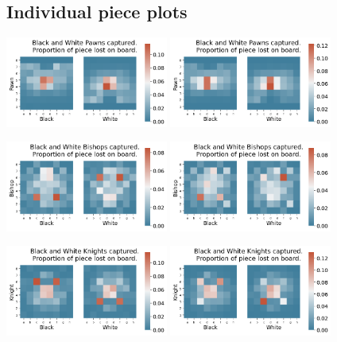 \documentclass[11pt]{article}
\begin{document}
\subsection{Individual piece plots}
\label{sec:org0718b0e}
\begin{center}
\includegraphics[width=0.4\textwidth]{Images/_HEATMAP_Pawn_FISC.png}
\includegraphics[width=0.4\textwidth]{Images/_HEATMAP_Pawn_TOURNEMENTS.png}
\end{center}
\begin{center}
\includegraphics[width=0.4\textwidth]{Images/_HEATMAP_Bishop_FISC.png}
\includegraphics[width=0.4\textwidth]{Images/_HEATMAP_Bishop_TOURNEMENTS.png}
\end{center}
\begin{center}
\includegraphics[width=0.4\textwidth]{Images/_HEATMAP_Knight_FISC.png}
\includegraphics[width=0.4\textwidth]{Images/_HEATMAP_Knight_TOURNEMENTS.png}
\end{center}
\end{document}
